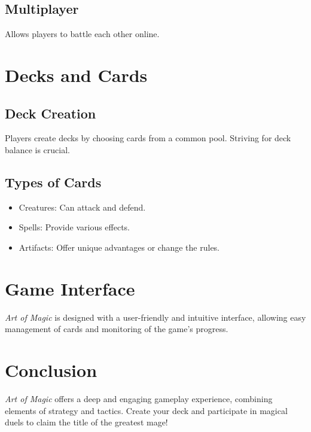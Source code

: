 \documentclass[12pt,a4paper]{article}
\begin{document}
\subsection{Multiplayer}
Allows players to battle each other online.

\section{Decks and Cards}
\subsection{Deck Creation}
Players create decks by choosing cards from a common pool. Striving for deck balance is crucial.

\subsection{Types of Cards}
\begin{itemize}
    \item Creatures: Can attack and defend.
    \item Spells: Provide various effects.
    \item Artifacts: Offer unique advantages or change the rules.
\end{itemize}

\section{Game Interface}
\textit{Art of Magic} is designed with a user-friendly and intuitive interface, allowing easy management of cards and monitoring of the game's progress.

\section{Conclusion}
\textit{Art of Magic} offers a deep and engaging gameplay experience, combining elements of strategy and tactics. Create your deck and participate in magical duels to claim the title of the greatest mage!

\newpage
\end{document}
